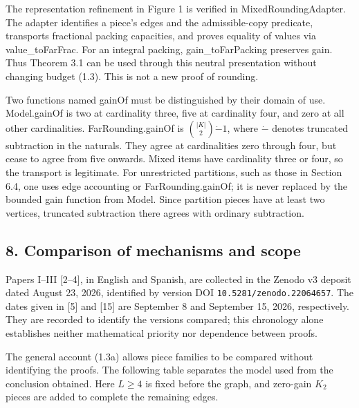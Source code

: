 \documentclass[english,11pt,a4paper]{article}
\begin{document}
The representation refinement in Figure 1 is verified in {\ttfamily\small MixedRoundin\discretionary{\hbox{\ensuremath{\hookrightarrow}}}{}{}gAdapter}. The adapter identifies a piece's edges and the admissible-copy predicate, transports fractional packing capacities, and proves equality of values via {\ttfamily\small value\_\discretionary{\hbox{\ensuremath{\hookrightarrow}}}{}{}toFarFrac}. For an integral packing, {\ttfamily\small gain\_\discretionary{\hbox{\ensuremath{\hookrightarrow}}}{}{}toFarPacking} preserves gain. Thus Theorem 3.1 can be used through this neutral presentation without changing budget (1.3). This is not a new proof of rounding.

Two functions named {\ttfamily\small gainOf} must be distinguished by their domain of use. {\ttfamily\small Model.\discretionary{\hbox{\ensuremath{\hookrightarrow}}}{}{}gainOf} is two at cardinality three, five at cardinality four, and zero at all other cardinalities. {\ttfamily\small FarRounding.\discretionary{\hbox{\ensuremath{\hookrightarrow}}}{}{}gainOf} is \(\binom{|K|}{2}\mathbin{\dot-}1\), where \(\dot-\) denotes truncated subtraction in the naturals. They agree at cardinalities zero through four, but cease to agree from five onwards. Mixed items have cardinality three or four, so the transport is legitimate. For unrestricted partitions, such as those in Section 6.4, one uses edge accounting or {\ttfamily\small FarRounding.\discretionary{\hbox{\ensuremath{\hookrightarrow}}}{}{}gainOf}; it is never replaced by the bounded gain function from {\ttfamily\small Model}. Since partition pieces have at least two vertices, truncated subtraction there agrees with ordinary subtraction.

\subsection{8. Comparison of mechanisms and scope}\label{comparison-of-mechanisms-and-scope}

Papers I--III {[}2--4{]}, in English and Spanish, are collected in the Zenodo v3 deposit dated August 23, 2026, identified by version DOI \nolinkurl{10.5281/zenodo.22064657}. The dates given in {[}5{]} and {[}15{]} are September 8 and September 15, 2026, respectively. They are recorded to identify the versions compared; this chronology alone establishes neither mathematical priority nor dependence between proofs.

The general account (1.3a) allows piece families to be compared without identifying the proofs. The following table separates the model used from the conclusion obtained. Here \(L\ge4\) is fixed before the graph, and zero-gain \(K_2\) pieces are added to complete the remaining edges.
\end{document}

